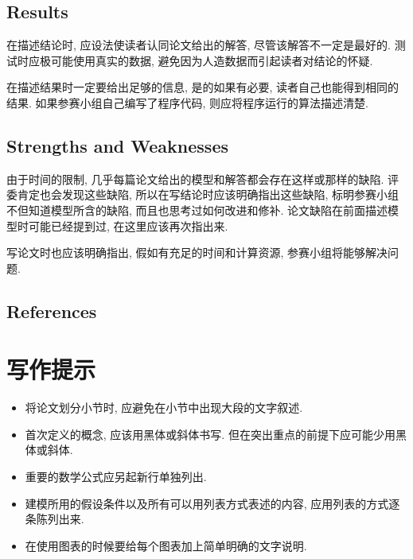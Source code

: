 \documentclass[openany]{ctexbook}
\begin{document}
    \section{Results}
    在描述结论时, 应设法使读者认同论文给出的解答, 尽管该解答不一定是最好的. 测试时应极可能使用真实的数据, 避免因为人造数据而引起读者对结论的怀疑.\par
    在描述结果时一定要给出足够的信息, 是的如果有必要, 读者自己也能得到相同的结果. 如果参赛小组自己编写了程序代码, 则应将程序运行的算法描述清楚.

    \section{Strengths and Weaknesses}
    由于时间的限制, 几乎每篇论文给出的模型和解答都会存在这样或那样的缺陷. 评委肯定也会发现这些缺陷, 所以在写结论时应该明确指出这些缺陷, 标明参赛小组不但知道模型所含的缺陷, 而且也思考过如何改进和修补. 论文缺陷在前面描述模型时可能已经提到过, 在这里应该再次指出来.\par
    写论文时也应该明确指出, 假如有充足的时间和计算资源, 参赛小组将能够解决问题.

    \section*{References}
    \lipsum[10]


\chapter{写作提示}
    \begin{itemize}
        \item 将论文划分小节时, 应避免在小节中出现大段的文字叙述.
        \item 首次定义的概念, 应该用黑体或斜体书写. 但在突出重点的前提下应可能少用黑体或斜体.
        \item 重要的数学公式应另起新行单独列出.
        \item 建模所用的假设条件以及所有可以用列表方式表述的内容, 应用列表的方式逐条陈列出来.
        \item 在使用图表的时候要给每个图表加上简单明确的文字说明.
    \end{itemize}
\end{document}
